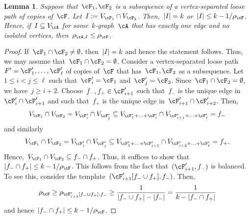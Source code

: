 \documentclass[11pt]{amsart}
\DeclarePairedDelimiter{\abs}{\lvert}{\rvert}
\newtheorem{lemma}[algocf]{Lemma}
\theoremstyle{definition}
\numberwithin{equation}{section}
\begin{document}
	\begin{lemma}\label{lemma: joins are small}
		Suppose that~$\cF_1,\cF_2$ is a subsequence of a vertex-separated loose path of copies of~$\cF$.
		Let~$I:=V_{\cF_1}\cap V_{\cF_{2}}$.
		Then,~$\abs{I}=k$ or~$\abs{I}\leq k-1/\rho_\cF$.
		Hence, if~$I\subseteq V_\cA$ for some~$k$-graph~$\cA$ that has exactly one edge and no isolated vertices, then~$\rho_{\cA,I}\leq \rho_\cF$.
	\end{lemma}
	\begin{proof}
		If~$\cF_1\cap \cF_{2}\neq\emptyset$, then~$\abs{I}=k$ and hence the statement follows.
		Thus, we may assume that~$\cF_1\cap \cF_{2}=\emptyset$.
		Consider a vertex-separated loose path~$F'=\cF_1',\ldots,\cF_{\ell}'$ of copies of~$\cF$ that has~$\cF_1,\cF_2$ as a subsequence.
		Let~$1\leq i<j\leq \ell$ such that~$\cF_{i}'=\cF_1$ and~$\cF_{j}'=\cF_{2}$.
		Since~$\cF_1\cap\cF_{2}=\emptyset$, we have~$j\geq i+2$.
		Choose~$f_-,f_+\in\cF_{i+1}'$ such that~$f_-$ is the unique edge in~$\cF_{i}'\cap \cF_{i+1}'$ and such that~$f_+$ is the unique edge in~$\cF_{i+1}'\cap \cF_{i+2}'$.
		Then,
		\begin{equation*}
			V_{\cF_1}\cap V_{\cF_{2}}
			=V_{\cF_{i}'}\cap V_{\cF_{j}'}
			\subseteq V_{\cF_1'+\ldots+\cF_{i}'}\cap V_{\cF_{i+1}'+\ldots+\cF_{\ell}'}
			=f_{-}
		\end{equation*}
		and similarly
		\begin{equation*}
			V_{\cF_1}\cap V_{\cF_{2}}
			=V_{\cF_{i}'}\cap V_{\cF_{j}'}
			\subseteq V_{\cF_1'+\ldots+\cF_{i+1}'}\cap V_{\cF_{i+2}'+\ldots+\cF_{\ell}'}
			=f_{+}.
		\end{equation*}
		Hence,~$V_{\cF_1}\cap V_{\cF_{2}}\subseteq f_-\cap f_+$.
		Thus, it suffices to show that~$\abs{f_-\cap f_+}\leq k-1/\rho_\cF$.
		This follows from the fact that~$(\cF_{i+1}',f_-)$ is balanced.
		To see this, consider the template~$(\cF_{i+1}'[f_-\cup f_+],f_-)$.
		Then,
		\begin{equation*}
			\rho_\cF
			\geq \rho_{\cF_{i+1}'[f_-\cup f_+],f_-}
			\geq \frac{1}{\abs{f_-\cup f_+}-\abs{f_-}}
			= \frac{1}{k-\abs{f_-\cap f_+}}
		\end{equation*}
		and hence~$\abs{f_-\cap f_+}\leq k-1/\rho_\cF$.
	\end{proof}
	
\end{document}
